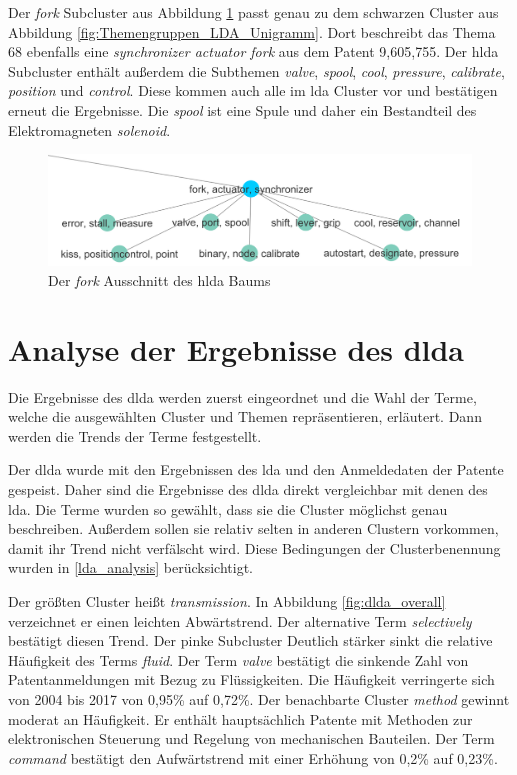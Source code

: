 Der \emph{fork} Subcluster aus Abbildung \ref{fig:hlda_fork} passt genau zu dem schwarzen Cluster aus Abbildung \ref{fig:Themengruppen_LDA_Unigramm}. Dort beschreibt das Thema 68 ebenfalls eine \emph{synchronizer actuator fork} aus dem Patent 9,605,755. Der \gls{hlda} Subcluster enthält außerdem die Subthemen \emph{valve}, \emph{spool}, \emph{cool}, \emph{pressure}, \emph{calibrate}, \emph{position} und \emph{control}. Diese kommen auch alle im \gls{lda} Cluster vor und bestätigen erneut die Ergebnisse. Die \emph{spool} ist eine Spule und daher ein Bestandteil des Elektromagneten \emph{solenoid}.

\begin{figure}[htpb]
	\centering
	\includegraphics[width=\textwidth,keepaspectratio=true]{img/hldaFork.png}
	\caption{
		Der \emph{fork} Ausschnitt des \gls{hlda} Baums
	}
	\label{fig:hlda_fork}
\end{figure}


\section{Analyse der Ergebnisse des \gls{dlda}}

Die Ergebnisse des \gls{dlda} werden zuerst eingeordnet und die Wahl der Terme, welche die ausgewählten Cluster und Themen repräsentieren, erläutert. Dann werden die Trends der Terme festgestellt.

Der \gls{dlda} wurde mit den Ergebnissen des \gls{lda} und den Anmeldedaten der Patente gespeist. Daher sind die Ergebnisse des \gls{dlda} direkt vergleichbar mit denen des \gls{lda}. Die Terme wurden so gewählt, dass sie die Cluster möglichst genau beschreiben. Außerdem sollen sie relativ selten in anderen Clustern vorkommen, damit ihr Trend nicht verfälscht wird. Diese Bedingungen der Clusterbenennung wurden in \ref{lda_analysis} berücksichtigt.

Der größten Cluster heißt \emph{transmission}. In Abbildung \ref{fig:dlda_overall} verzeichnet er einen leichten Abwärtstrend. Der alternative Term \emph{selectively} bestätigt diesen Trend. Der pinke Subcluster  Deutlich stärker sinkt die relative Häufigkeit des Terms \emph{fluid}. Der Term \emph{valve} bestätigt die sinkende Zahl von Patentanmeldungen mit Bezug zu Flüssigkeiten. Die Häufigkeit verringerte sich von 2004 bis 2017 von 0,95\% auf 0,72\%. Der benachbarte Cluster \emph{method} gewinnt moderat an Häufigkeit. Er enthält hauptsächlich Patente mit Methoden zur elektronischen Steuerung und Regelung von mechanischen Bauteilen. Der Term \emph{command} bestätigt den Aufwärtstrend mit einer Erhöhung von 0,2\% auf 0,23\%. 



